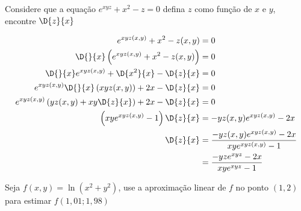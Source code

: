 \documentclass[a4paper,12pt,fleqn]{article}
\begin{document}

Considere que a equação
\(
  e^{xyz} + x^2 - z = 0
\)
defina $z$ como função de $x$ e $y$, encontre \(\D{z}{x}\)
\clearpagequestiononly

\begin{answer}
  \begin{align*}
    e^{xyz(x, y)} + x^2 - z(x, y)                                    & = 0 \\
    \D{}{x}\left( e^{xyz(x, y)} + x^2 - z(x, y) \right)              & = 0 \\
    \D{}{x}e^{xyz(x, y)} + \D{x^2}{x} - \D{z}{x}                     & = 0 \\
    e^{xyz(x, y)}\D{}{x}\left(xyz(x, y)\right) + 2x - \D{z}{x}       & = 0 \\
    e^{xyz(x, y)}\left(yz(x, y) + xy \D{z}{x}\right) + 2x - \D{z}{x} & = 0 \\
    \left( xy e^{xyz(x, y)} - 1 \right) \D{z}{x}
    & = - yz(x, y) e^{xyz(x, y)} - 2x  \\
    \D{z}{x}
    & = \frac{ - yz(x, y) e^{xyz(x, y)} - 2x }{ xy e^{xyz(x, y)} - 1 } \\
    & = \frac{ - yz e^{xyz} - 2x }{ xy e^{xyz} - 1 }
  \end{align*}
\end{answer}

Seja \( f(x, y) = \ln(x^2 + y^2) \),
use a aproximação linear de $f$ no ponto $(1, 2)$
para estimar $f(1,01; 1,98)$
\clearpagequestiononly
\end{document}
